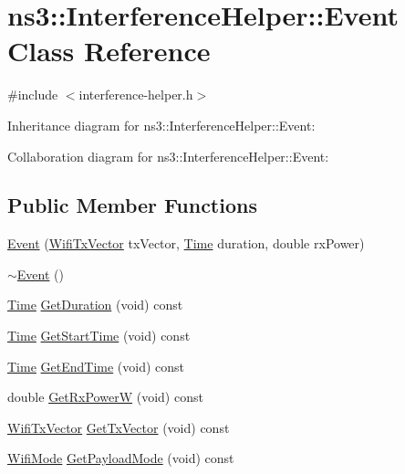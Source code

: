 \hypertarget{classns3_1_1InterferenceHelper_1_1Event}{}\section{ns3\+:\+:Interference\+Helper\+:\+:Event Class Reference}
\label{classns3_1_1InterferenceHelper_1_1Event}


{\ttfamily \#include $<$interference-\/helper.\+h$>$}



Inheritance diagram for ns3\+:\+:Interference\+Helper\+:\+:Event\+:


Collaboration diagram for ns3\+:\+:Interference\+Helper\+:\+:Event\+:
\subsection*{Public Member Functions}
\begin{DoxyCompactItemize}
\item 
\hyperlink{classns3_1_1InterferenceHelper_1_1Event_a72a1000e07aa5d67e1e1a0c3227b7936}{Event} (\hyperlink{classns3_1_1WifiTxVector}{Wifi\+Tx\+Vector} tx\+Vector, \hyperlink{classns3_1_1Time}{Time} duration, double rx\+Power)
\item 
\hyperlink{classns3_1_1InterferenceHelper_1_1Event_ad9792649c0c3284e3b78dacc2c6c6557}{$\sim$\+Event} ()
\item 
\hyperlink{classns3_1_1Time}{Time} \hyperlink{classns3_1_1InterferenceHelper_1_1Event_a22e5ee36eafbc7ac29cda9b80665147c}{Get\+Duration} (void) const 
\item 
\hyperlink{classns3_1_1Time}{Time} \hyperlink{classns3_1_1InterferenceHelper_1_1Event_a40a239e672ce4efb74085016774c4de3}{Get\+Start\+Time} (void) const 
\item 
\hyperlink{classns3_1_1Time}{Time} \hyperlink{classns3_1_1InterferenceHelper_1_1Event_a6f150ce95f71b5aedc8d8f8ed3c4b06b}{Get\+End\+Time} (void) const 
\item 
double \hyperlink{classns3_1_1InterferenceHelper_1_1Event_a0cd80882ea3f39afd7d59907c5f127a3}{Get\+Rx\+PowerW} (void) const 
\item 
\hyperlink{classns3_1_1WifiTxVector}{Wifi\+Tx\+Vector} \hyperlink{classns3_1_1InterferenceHelper_1_1Event_a59cb6ce984900e2e6995fdac16f4eb18}{Get\+Tx\+Vector} (void) const 
\item 
\hyperlink{classns3_1_1WifiMode}{Wifi\+Mode} \hyperlink{classns3_1_1InterferenceHelper_1_1Event_ae19a09cc7fcf1f23647d5d74c5b324a8}{Get\+Payload\+Mode} (void) const 
\end{DoxyCompactItemize}
